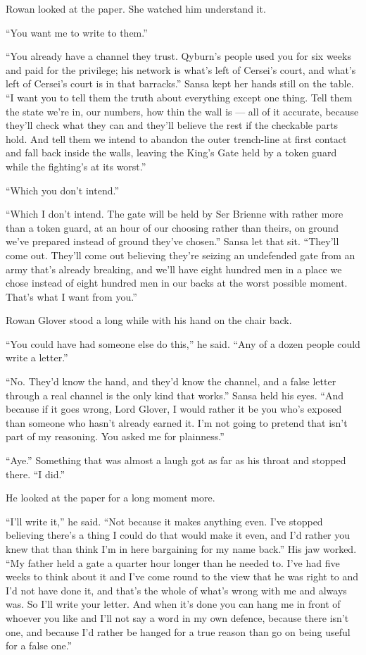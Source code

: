 Rowan looked at the paper. She watched him understand it.

“You want me to write to them.”

“You already have a channel they trust. Qyburn’s people used you for six weeks and paid for the privilege; his network is what’s left of Cersei’s court, and what’s left of Cersei’s court is in that barracks.” Sansa kept her hands still on the table. “I want you to tell them the truth about everything except one thing. Tell them the state we’re in, our numbers, how thin the wall is — all of it accurate, because they’ll check what they can and they’ll believe the rest if the checkable parts hold. And tell them we intend to abandon the outer trench-line at first contact and fall back inside the walls, leaving the King’s Gate held by a token guard while the fighting’s at its worst.”

“Which you don’t intend.”

“Which I don’t intend. The gate will be held by Ser Brienne with rather more than a token guard, at an hour of our choosing rather than theirs, on ground we’ve prepared instead of ground they’ve chosen.” Sansa let that sit. “They’ll come out. They’ll come out believing they’re seizing an undefended gate from an army that’s already breaking, and we’ll have eight hundred men in a place we chose instead of eight hundred men in our backs at the worst possible moment. That’s what I want from you.”

Rowan Glover stood a long while with his hand on the chair back.

“You could have had someone else do this,” he said. “Any of a dozen people could write a letter.”

“No. They’d know the hand, and they’d know the channel, and a false letter through a real channel is the only kind that works.” Sansa held his eyes. “And because if it goes wrong, Lord Glover, I would rather it be you who’s exposed than someone who hasn’t already earned it. I’m not going to pretend that isn’t part of my reasoning. You asked me for plainness.”

“Aye.” Something that was almost a laugh got as far as his throat and stopped there. “I did.”

He looked at the paper for a long moment more.

“I’ll write it,” he said. “Not because it makes anything even. I’ve stopped believing there’s a thing I could do that would make it even, and I’d rather you knew that than think I’m in here bargaining for my name back.” His jaw worked. “My father held a gate a quarter hour longer than he needed to. I’ve had five weeks to think about it and I’ve come round to the view that he was right to and I’d not have done it, and that’s the whole of what’s wrong with me and always was. So I’ll write your letter. And when it’s done you can hang me in front of whoever you like and I’ll not say a word in my own defence, because there isn’t one, and because I’d rather be hanged for a true reason than go on being useful for a false one.”

